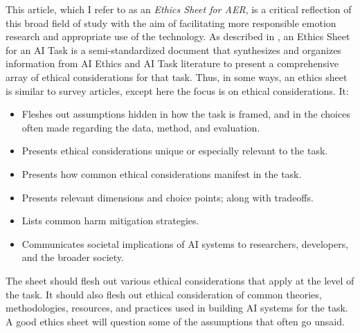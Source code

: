 \documentclass{clv3}
\newcommand{\bl}{\color{blue}}
\begin{document}
This article, which I refer to as an \textit{Ethics Sheet for AER}, is a critical reflection of this broad field of study with the aim of facilitating more responsible emotion research and appropriate use of the technology.
As described in \citet{mohammad2021ethics}, an Ethics Sheet for an AI Task is a semi-standardized document that
synthesizes and organizes information from AI Ethics and AI Task literature to
present a comprehensive array of ethical considerations for that task. 
Thus, in some ways, an ethics sheet is similar to survey articles, except here the focus is on ethical considerations.
It:\\[-20pt]
\begin{itemize}
    \item Fleshes out assumptions hidden in how the task is framed, and in the choices often made regarding the data, method, and evaluation.
    \vspace*{-1mm}
    \item Presents ethical considerations unique or especially relevant to the task.
    \vspace*{-1mm}
    \item Presents how common ethical considerations manifest in the task.
    \vspace*{-1mm}
    \item Presents relevant dimensions and choice points; along with tradeoffs. %
    \vspace*{-1mm}
    \item Lists common harm mitigation strategies.
    \vspace*{-1mm}
    \item Communicates societal implications of AI systems to researchers, developers, and the broader society.
\end{itemize}
\vspace*{-2mm}
\noindent The sheet should flesh out various ethical considerations that apply at the level of the task. It should also flesh out ethical consideration of common theories, methodologies, resources,  and practices used in building AI systems for the task. A good ethics sheet will question some of the assumptions that often go unsaid.\\[5pt]
\end{document}
